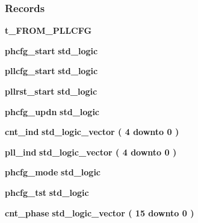 \subsubsection*{Records}
 \begin{DoxyCompactItemize}
\item 
{\bf t\+\_\+\+F\+R\+O\+M\+\_\+\+P\+L\+L\+C\+FG} {\bfseries  }
\item 
{\bf phcfg\+\_\+start} {\bfseries {\bfseries \textcolor{comment}{std\+\_\+logic}\textcolor{vhdlchar}{ }}} 
\item 
{\bf pllcfg\+\_\+start} {\bfseries {\bfseries \textcolor{comment}{std\+\_\+logic}\textcolor{vhdlchar}{ }}} 
\item 
{\bf pllrst\+\_\+start} {\bfseries {\bfseries \textcolor{comment}{std\+\_\+logic}\textcolor{vhdlchar}{ }}} 
\item 
{\bf phcfg\+\_\+updn} {\bfseries {\bfseries \textcolor{comment}{std\+\_\+logic}\textcolor{vhdlchar}{ }}} 
\item 
{\bf cnt\+\_\+ind} {\bfseries {\bfseries \textcolor{comment}{std\+\_\+logic\+\_\+vector}\textcolor{vhdlchar}{ }\textcolor{vhdlchar}{(}\textcolor{vhdlchar}{ }\textcolor{vhdlchar}{ } \textcolor{vhdldigit}{4} \textcolor{vhdlchar}{ }\textcolor{keywordflow}{downto}\textcolor{vhdlchar}{ }\textcolor{vhdlchar}{ } \textcolor{vhdldigit}{0} \textcolor{vhdlchar}{ }\textcolor{vhdlchar}{)}\textcolor{vhdlchar}{ }}} 
\item 
{\bf pll\+\_\+ind} {\bfseries {\bfseries \textcolor{comment}{std\+\_\+logic\+\_\+vector}\textcolor{vhdlchar}{ }\textcolor{vhdlchar}{(}\textcolor{vhdlchar}{ }\textcolor{vhdlchar}{ } \textcolor{vhdldigit}{4} \textcolor{vhdlchar}{ }\textcolor{keywordflow}{downto}\textcolor{vhdlchar}{ }\textcolor{vhdlchar}{ } \textcolor{vhdldigit}{0} \textcolor{vhdlchar}{ }\textcolor{vhdlchar}{)}\textcolor{vhdlchar}{ }}} 
\item 
{\bf phcfg\+\_\+mode} {\bfseries {\bfseries \textcolor{comment}{std\+\_\+logic}\textcolor{vhdlchar}{ }}} 
\item 
{\bf phcfg\+\_\+tst} {\bfseries {\bfseries \textcolor{comment}{std\+\_\+logic}\textcolor{vhdlchar}{ }}} 
\item 
{\bf cnt\+\_\+phase} {\bfseries {\bfseries \textcolor{comment}{std\+\_\+logic\+\_\+vector}\textcolor{vhdlchar}{ }\textcolor{vhdlchar}{(}\textcolor{vhdlchar}{ }\textcolor{vhdlchar}{ } \textcolor{vhdldigit}{15} \textcolor{vhdlchar}{ }\textcolor{keywordflow}{downto}\textcolor{vhdlchar}{ }\textcolor{vhdlchar}{ } \textcolor{vhdldigit}{0} \textcolor{vhdlchar}{ }\textcolor{vhdlchar}{)}\textcolor{vhdlchar}{ }}} 

\end{DoxyCompactItemize}
